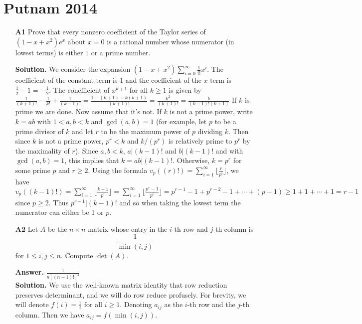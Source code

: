 \documentclass[11pt,a4paper]{article}
\newcommand{\<}{\langle}
\renewcommand{\>}{\rangle}
\begin{document}
\section{Putnam 2014}
\begin{enumerate}
	\item [\textbf{A1}]Prove that every nonzero coefficient of the Taylor series of $(1-x+x^2)e^x$ about $x=0$ is a rational number whose numerator (in lowest terms) is either $1$ or a prime number.
	
	\textbf{Solution.} We consider the expansion $(1-x+x^2)\displaystyle\sum_{i=0}^{\infty} \frac{1}{i!}x^i$. The coefficient of the constant term is 1 and the coefficient of the $x$-term is $\frac{1}{2}-1=-\frac{1}{2}$. The conefficient of $x^{k+1}$ for all $k\ge 1$ is given by $\frac{1}{(k+1)!}-\frac{1}{k!}+\frac{1}{(k-1)!}
	=\frac{1-(k+1)+k(k+1)}{(k+1)!}
	=\frac{k^2}{(k+1)!}
	=\frac{k}{(k-1)!(k+1)}
	$
	If $k$ is prime we are done. 
	Now assume that it's not. If $k$ is not a prime power, write $k=ab$ with $1<a, b<k$ and $\gcd(a, b)=1$ (for example, let $p$ to be a prime divisor of $k$ and let $r$ to be the maximum power of $p$ dividing $k$. Then since $k$ is not a prime power, $p^r<k$ and $k/(p^r)$ is relatively prime to $p^r$ by the maximality of $r$). Since $a, b<k$, $a|(k-1)!$ and $b|(k-1)!$ and with $\gcd(a, b)=1$, this implies that $k=ab|(k-1)!$. Otherwise, $k=p^r$ for some prime $p$ and $r\ge 2$. Using the formula $v_p((r)!)=\sum_{i=1}^\infty\lfloor\frac{r}{p^i}\rfloor$, we have 
	$v_p((k-1)!)=\sum_{i=1}^\infty\lfloor\frac{k-1}{p^i}\rfloor
	=\sum_{i=1}^\infty\lfloor\frac{p^r-1}{p^i}\rfloor
	=p^{r-1}-1+p^{r-2}-1+\cdots + (p-1)
	\ge 1+1+\cdots + 1
	= r-1
	$
	since $p\ge 2$. Thus $p^{r-1}|(k-1)!$ and so when taking the lowest term the numerator can either be 1 or $p$. 
	
	\item[\textbf{A2}]Let $A$ be the $n\times n$ matrix whose entry in the $i$-th row and $j$-th column is \[\frac1{\min(i,j)}\] for $1\le i,j\le n.$ Compute $\det(A).$
	
	\textbf{Answer.} $\frac{1}{n[(n-1)!]^2}$\\
	\textbf{Solution.} We use the well-known matrix identity that row reduction preserves determinant, and we will do row reduce profusely. For brevity, we will denote $f(i)=\frac{1}{i}$ for all $i\ge 1$. Denoting $a_{ij}$ as the $i$-th row and the $j$-th column. Then we have $a_{ij}=f(\min(i, j))$. 
	

\end{enumerate}
\end{document}
